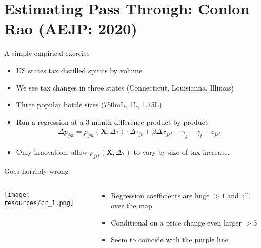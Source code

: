 \section{Estimating Pass Through: Conlon Rao (AEJP: 2020)}

\begin{frame}{A simple empirical exercise}
\begin{itemize}
\item US states tax distilled spirits by volume
\item We see tax changes in three states (Connecticut, Louisianna, Illinois)
\item Three popular bottle sizes (750mL, 1L, 1.75L)
\item Run a regression at a 3 month difference product by product
\begin{align*}
\Delta p_{j s t}=\rho_{j s t}(\mathbf{X}, \Delta \tau) \cdot \Delta \tau_{j t}+\beta \Delta x_{j s t}+\gamma_j+\gamma_t+\epsilon_{j s t}
\end{align*}
\item Only innovation: allow $\rho_{j s t}(\mathbf{X}, \Delta \tau) $ to vary by size of tax increase.
\end{itemize}
\end{frame}


\begin{frame}{Goes horribly wrong}
\begin{columns}
\begin{column}{0.4\textwidth}
\texttt{[image: resources/cr\_1.png]}
\end{column}
\begin{column}{0.5\textwidth}
\begin{itemize}
\item Regression coefficients are huge $>1$ and all over the map
\item Conditional on a price change even larger $>3$
\item Seem to coincide with the purple line 
\end{itemize}
\end{column}
\end{columns}
\end{frame}


